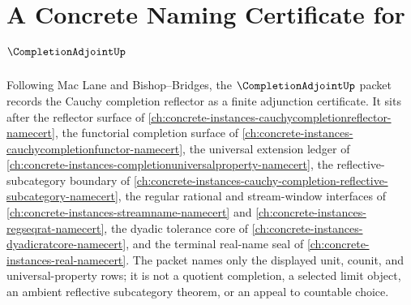 \chapter{A Concrete Naming Certificate for $\CompletionAdjointUp$}
\label{ch:concrete-instances-completion-adjoint-namecert}

Following Mac Lane and Bishop--Bridges, the $\CompletionAdjointUp$ packet records the Cauchy completion reflector as a finite adjunction certificate. It sits after the reflector surface of \autoref{ch:concrete-instances-cauchycompletionreflector-namecert}, the functorial completion surface of \autoref{ch:concrete-instances-cauchycompletionfunctor-namecert}, the universal extension ledger of \autoref{ch:concrete-instances-completionuniversalproperty-namecert}, the reflective-subcategory boundary of \autoref{ch:concrete-instances-cauchy-completion-reflective-subcategory-namecert}, the regular rational and stream-window interfaces of \autoref{ch:concrete-instances-streamname-namecert} and \autoref{ch:concrete-instances-regseqrat-namecert}, the dyadic tolerance core of \autoref{ch:concrete-instances-dyadicratcore-namecert}, and the terminal real-name seal of \autoref{ch:concrete-instances-real-namecert}. The packet names only the displayed unit, counit, and universal-property rows; it is not a quotient completion, a selected limit object, an ambient reflective subcategory theorem, or an appeal to countable choice.

